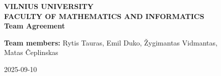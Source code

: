 \begin{titlepage}
    \begin{center}
        \textbf{VILNIUS UNIVERSITY}\\
        \textbf{FACULTY OF MATHEMATICS AND INFORMATICS}\\
        \vspace*{1cm}
        \textbf{Team Agreement}\\
    \end{center}
    \vspace*{5cm}
    \begin{flushright}
        \textbf{Team members:}
        Rytis Tauras, Emil Duko, Žygimantas Vidmantas,\\Matas Čeplinskas
    \end{flushright}
    \vfill
    \begin{center}
        2025-09-10
    \end{center}
\end{titlepage}